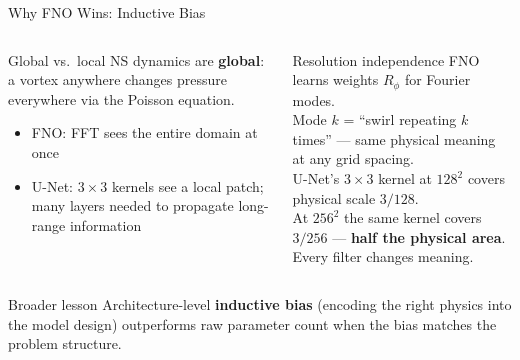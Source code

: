 \documentclass[aspectratio=169, 11pt]{beamer}
\begin{document}
\begin{frame}{Why FNO Wins: Inductive Bias}
  \begin{columns}[t]
      \begin{block}{Global vs.\ local}
        NS dynamics are \textbf{global}: a vortex anywhere changes pressure
        everywhere via the Poisson equation.
        \begin{itemize}
          \item FNO: FFT sees the entire domain at once
          \item U-Net: $3\times3$ kernels see a local patch; many layers needed
                to propagate long-range information
        \end{itemize}
      \end{block}
      \begin{block}{Resolution independence}
        FNO learns weights $R_\phi$ for Fourier modes.\\
        Mode $k$ = ``swirl repeating $k$ times'' ---
        same physical meaning at any grid spacing.\\[4pt]
        U-Net's $3\times3$ kernel at $128^2$ covers physical scale $3/128$.\\
        At $256^2$ the same kernel covers $3/256$ ---
        \textbf{half the physical area}. Every filter changes meaning.
      \end{block}
  \end{columns}
  \vspace{0.4em}
  \begin{alertblock}{Broader lesson}
    Architecture-level \textbf{inductive bias} (encoding the right physics into the model design)
    outperforms raw parameter count when the bias matches the problem structure.
  \end{alertblock}
\end{frame}
\end{document}
